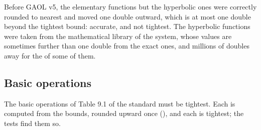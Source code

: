 \documentclass[12pt,a4paper,twoside,openright]{book}
\begin{document}
\begin{Rem}\label{rem:accuracy-before}
Before GAOL v5, the elementary functions but the hyperbolic ones were
correctly rounded to nearest and moved one double outward, which is at most one double beyond the
tightest bound: accurate, and not tightest. The hyperbolic functions were
taken from the mathematical library of the system, whose values are
sometimes further than one double from the exact ones, and millions of
doubles away for the  of some of them.\newinvfive
\end{Rem}

\subsection{Basic operations}\label{sec:accuracy-basic}

The basic operations of Table 9.1 of the standard must be tightest. Each is
computed from the bounds, rounded upward once (), and
each is tightest; the tests find them so.
\end{document}
